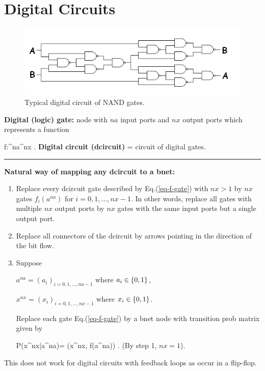 \chapter{Digital Circuits}

\begin{figure}[h!]
\centering
\includegraphics[width=6in]{d-ckt/d-ckt.png}
\caption{Typical digital circuit
of NAND gates.}
\label{fig-d-ckt}
\end{figure}

{\bf Digital (logic) gate:} node with
$na$ input ports and $nx$ output ports
which represents a function

\beq
f:\bool^{na}\rarrow \bool^{nx}
\;.
\label{eq-f-gate}
\eeq
{\bf Digital circuit (dcircuit)} = circuit of digital gates.


\hrule\noindent
{\bf Natural way of mapping any
dcircuit to a bnet:}
\begin{enumerate}
\item
Replace every dcircuit  gate 
described by Eq.(\ref{eq-f-gate})
with
$nx>1$ by
$nx$ gates $f_i(a^{na})$
for $i=0, 1, \ldots, nx-1$.
In other words,
replace all gates
with
multiple $nx$ output ports
by $nx$ gates with the same input ports
but a single output port.
\item
Replace
all connectors of the dcircuit
by arrows 
pointing in the direction
of the bit flow.

\item
Suppose

$a^{na}=(a_i)_{i=0, 1,\dots, na-1}$ 
where $a_i\in \{0,1\}$,

$x^{nx}=(x_i)_{i=0, 1,\dots, nx-1}$ 
where $x_i\in \{0,1\}$. 

 Replace each gate Eq.(\ref{eq-f-gate})
 by a bnet 
node with transition
prob matrix given by


\beq\color{blue}
P(x^{nx}|a^{na})=
\delta(x^{nx}, f(a^{na}))
\;.
\eeq
(By step 1, $nx=1$).

\end{enumerate}

This does not work
for digital circuits 
with feedback loops 
as occur in a flip-flop.